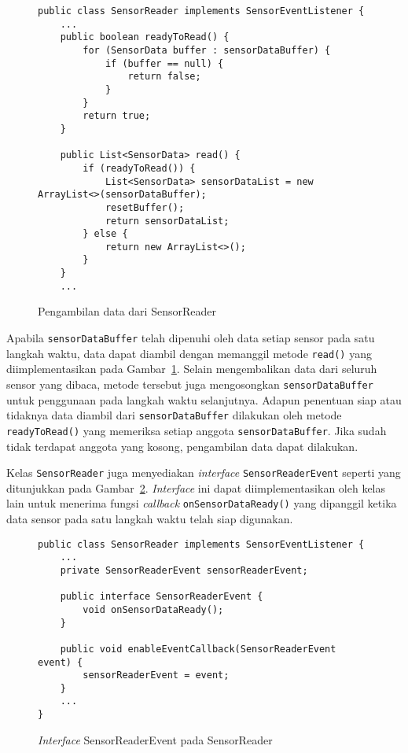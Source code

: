 \begin{figure}[h!]
\begin{verbatim}
public class SensorReader implements SensorEventListener {
    ...
    public boolean readyToRead() {
        for (SensorData buffer : sensorDataBuffer) {
            if (buffer == null) {
                return false;
            }
        }
        return true;
    }

    public List<SensorData> read() {
        if (readyToRead()) {
            List<SensorData> sensorDataList = new ArrayList<>(sensorDataBuffer);
            resetBuffer();
            return sensorDataList;
        } else {
            return new ArrayList<>();
        }
    }
    ...
\end{verbatim}
\caption{Pengambilan data dari SensorReader}
\label{listing:aktvtas-pengambilan-sensorreader}
\end{figure}

Apabila \texttt{sensorDataBuffer} telah dipenuhi oleh data setiap sensor pada satu langkah waktu, data dapat diambil dengan memanggil metode \texttt{read()} yang diimplementasikan pada Gambar~\ref{listing:aktvtas-pengambilan-sensorreader}. Selain mengembalikan data dari seluruh sensor yang dibaca, metode tersebut juga mengosongkan \texttt{sensorDataBuffer} untuk penggunaan pada langkah waktu selanjutnya. Adapun penentuan siap atau tidaknya data diambil dari \texttt{sensorDataBuffer} dilakukan oleh metode \texttt{readyToRead()} yang memeriksa setiap anggota \texttt{sensorDataBuffer}. Jika sudah tidak terdapat anggota yang kosong, pengambilan data dapat dilakukan.

Kelas \texttt{SensorReader} juga menyediakan \textit{interface} \texttt{SensorReaderEvent} seperti yang ditunjukkan pada Gambar~\ref{listing:aktvtas-sensorreaderevent}. \textit{Interface} ini dapat diimplementasikan oleh kelas lain untuk menerima fungsi \textit{callback} \texttt{onSensorDataReady()} yang dipanggil ketika data sensor pada satu langkah waktu telah siap digunakan.

\begin{figure}[h]
\begin{verbatim}
public class SensorReader implements SensorEventListener {
    ...
    private SensorReaderEvent sensorReaderEvent;

    public interface SensorReaderEvent {
        void onSensorDataReady();
    }

    public void enableEventCallback(SensorReaderEvent event) {
        sensorReaderEvent = event;
    }
    ...
}
\end{verbatim}
\caption{\textit{Interface} SensorReaderEvent pada SensorReader}
\label{listing:aktvtas-sensorreaderevent}
\end{figure}

